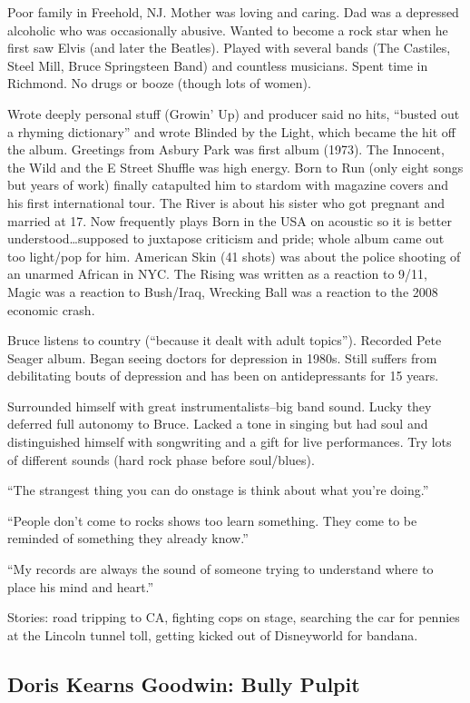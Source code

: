 \documentclass[
]{article}
\begin{document}
Poor family in Freehold, NJ. Mother was loving and caring. Dad was a
depressed alcoholic who was occasionally abusive. Wanted to become a
rock star when he first saw Elvis (and later the Beatles). Played with
several bands (The Castiles, Steel Mill, Bruce Springsteen Band) and
countless musicians. Spent time in Richmond. No drugs or booze (though
lots of women).

Wrote deeply personal stuff (Growin' Up) and producer said no hits,
``busted out a rhyming dictionary'' and wrote Blinded by the Light,
which became the hit off the album. Greetings from Asbury Park was first
album (1973). The Innocent, the Wild and the E Street Shuffle was high
energy. Born to Run (only eight songs but years of work) finally
catapulted him to stardom with magazine covers and his first
international tour. The River is about his sister who got pregnant and
married at 17. Now frequently plays Born in the USA on acoustic so it is
better understood\ldots supposed to juxtapose criticism and pride; whole
album came out too light/pop for him. American Skin (41 shots) was about
the police shooting of an unarmed African in NYC. The Rising was written
as a reaction to 9/11, Magic was a reaction to Bush/Iraq, Wrecking Ball
was a reaction to the 2008 economic crash.

Bruce listens to country (``because it dealt with adult topics'').
Recorded Pete Seager album. Began seeing doctors for depression in
1980s. Still suffers from debilitating bouts of depression and has been
on antidepressants for 15 years.

Surrounded himself with great instrumentalists--big band sound. Lucky
they deferred full autonomy to Bruce. Lacked a tone in singing but had
soul and distinguished himself with songwriting and a gift for live
performances. Try lots of different sounds (hard rock phase before
soul/blues).

``The strangest thing you can do onstage is think about what you're
doing.''

``People don't come to rocks shows too learn something. They come to be
reminded of something they already know.''

``My records are always the sound of someone trying to understand where
to place his mind and heart.''

Stories: road tripping to CA, fighting cops on stage, searching the car
for pennies at the Lincoln tunnel toll, getting kicked out of
Disneyworld for bandana.

\hypertarget{doris-kearns-goodwin-bully-pulpit}{%
\subsection{Doris Kearns Goodwin: Bully
Pulpit}\label{doris-kearns-goodwin-bully-pulpit}}
\end{document}

